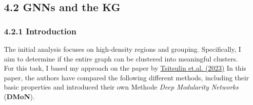 \documentclass[
]{article}
\begin{document}
\subsection{4.2 GNNs and the KG}\label{gnns-and-the-kg}

\subsubsection{4.2.1 Introduction}\label{introduction-2}

The initial analysis focuses on high-density regions and grouping.
Specifically, I aim to determine if the entire graph can be clustered
into meaningful clusters. For this task, I based my approach on the
paper by
\href{https://www.jmlr.org/papers/volume24/20-998/20-998.pdf}{Tsitsulin
et.al. (2023)} In this paper, the authors have compared the following
different methods, including their basic properties and introduced their
own Methode \emph{Deep Modularity Networks} (\textbf{DMoN}).
\end{document}
